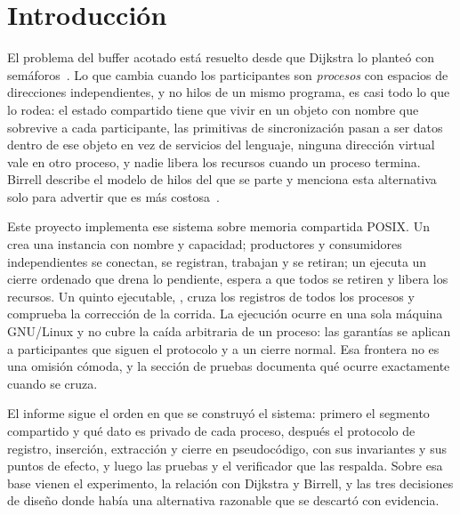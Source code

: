 \section{Introducción}
\label{sec:introduccion}

El problema del buffer acotado está resuelto desde que Dijkstra lo planteó
con semáforos~\cite{Dijkstra1965}. Lo que cambia cuando los participantes
son \emph{procesos} con espacios de direcciones independientes, y no hilos
de un mismo programa, es casi todo lo que lo rodea: el estado compartido
tiene que vivir en un objeto con nombre que sobrevive a cada participante,
las primitivas de sincronización pasan a ser datos dentro de ese objeto en
vez de servicios del lenguaje, ninguna dirección virtual vale en otro
proceso, y nadie libera los recursos cuando un proceso termina. Birrell
describe el modelo de hilos del que se parte y menciona esta alternativa
solo para advertir que es más costosa~\cite{Birrell1989}.

Este proyecto implementa ese sistema sobre memoria compartida POSIX. Un
 crea una instancia con nombre y capacidad; productores y
consumidores independientes se conectan, se registran, trabajan y se
retiran; un  ejecuta un cierre ordenado que drena lo
pendiente, espera a que todos se retiren y libera los recursos. Un quinto
ejecutable, , cruza los registros de todos los procesos y
comprueba la corrección de la corrida. La ejecución ocurre en una sola
máquina
GNU/Linux y no cubre la caída arbitraria de un proceso: las garantías se
aplican a participantes que siguen el protocolo y a un cierre normal. Esa
frontera no es una omisión cómoda, y la sección de pruebas documenta qué
ocurre exactamente cuando se cruza.

El informe sigue el orden en que se construyó el sistema: primero el
segmento compartido y qué dato es privado de cada proceso, después el
protocolo de registro, inserción, extracción y cierre en pseudocódigo, con
sus invariantes y sus puntos de efecto, y luego las pruebas y el verificador
que las respalda. Sobre esa base vienen el experimento, la relación con
Dijkstra y Birrell, y las tres decisiones de diseño donde había una
alternativa razonable que se descartó con evidencia.
